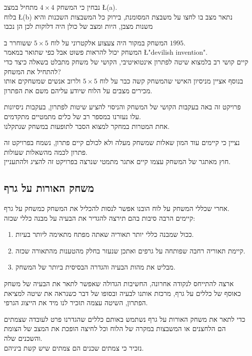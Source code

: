 \documentclass[12pt,twoside]{article}
\begin{document}
נבחין כי המשחק 
$4 \times 4$
מתחיל במצב
\L{(a)}.
\\
בלוח 
\L{(b)}
נתאר מצב בו לחצו על משבצת המסומנת, בירוק
כל המשבצות השכנות והיא משנות מצבן, היות ומצב של כולן היה דלוקות לכן הן נכבו

המשחק במקור היה צעצוע אלקטרוני על לוח 
$5 \times 5$
ששוחרר ב 
$1995$.
\\
המשחק יכול להראות פשוט אבל כפי שתואר
במאמר
\cite{B1}
\L{"devilish invention"}.
\\
קיים קושי רב בלמצוא שיטה לפתרון אינטואיטיבי, הקושי של משחק מתבלט בשאלה כיצד כדי להתחיל את המשחק?
\\
בנוסף אציין מניסיון האישי שהמשחק קשה כבר 
על לוח 
$5 \times 5$
ולרוב אנשים שמשחקים אותו מכירים מצבים על הלוח שיודע עליהם משם את הפתרון.

פרויקט זה באה בעקבות הקושי של המשחק
והניסוי להציע שיטות לפתרון, בעקבות ניסיונות עלו
נעזרנו במספר רב של כלים מתמטיים מתקדמים.
\\
אחת המטרות במחקר למצוא הסבר לתופעות במשחק שנתקלנו.

נציין כי קיימים עוד המון שאלות שמשחק מעלה ולא לכולם קיים פתרון,
נשמח בפרויקט זה פתרון לכמה מהשאלות שעולות.
\\
חוץ מאתגר של המשחק עצמו קיים אתגר מתמטי שנרצה בפרויקט זה להציג ולהתעניין.


\subsection{ משחק האורות על גרף}
אחרי שכללי המשחק על לוח הובנו אפשר לנסות להכליל את המשחק כמשחק על גרף.
\\
קיימים הרבה סיבות בהם תירצה להגדיר את הבעיה על מבנה כללי שכזה:

\begin{enumerate}
    \item 
    ככול שמבנה כללי יותר תאוריה שאתה מפתח מתאימה ליותר בעיות.
    \item 
    קיימת תאוריה רחבה שפותחה על גרפים ואתכן שנעזר בחלק
    מהטענות מהתאורה שכזה.
    \item 
    מבליט את מהות הבעיה והגדרה הבסיסית ביותר של המשחק.
\end{enumerate}

ארצה להתייחס לנקודה אחרונה, החשיבות הגדולה שאפשר לתאר את הבעיה של משחק
כאוסף של כללים על גרף, מרכזת אותנו לבעיה ובסופו של דבר כשנראה את שיטה למציאת
הפתרון, השיטה עצמה תזכיר לנו מיד את הייצוג הגרפי.

כדי לתאר את משחק האורות על גרף נשתמש באותם כללים שהגדרנו פרט לעובדה
שצמתים הם הלחצנים או המשבצות במקרה של הלוח
וכל לחיצה הופכת את המצב של הצומת והשכנים שלה.
\\
נזכיר כי צמתים שכנים הם צמתים שיש
קשת ביניהם.
\end{document}

